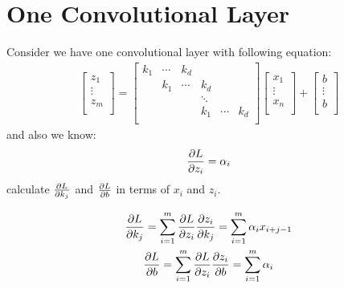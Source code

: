 \documentclass[12pt]{article}
\begin{document}
\section{One Convolutional Layer}
Consider we have one convolutional layer with following equation:
\begin{gather*}
    \begin{bmatrix}
        z_{1}  \\
        \vdots \\
        z_{m}  \\
    \end{bmatrix}
    = \begin{bmatrix}
        k_1 & \cdots & k_d    &        &        &     \\
            & k_1    & \cdots & k_d    &        &     \\
            &        &        & \ddots &        &     \\
            &        &        & k_1    & \cdots & k_d \\
    \end{bmatrix}
    \begin{bmatrix}
        x_{1}  \\
        \vdots \\
        x_{n}  \\
    \end{bmatrix}
    + \begin{bmatrix}
        b      \\
        \vdots \\
        b      \\
    \end{bmatrix}
\end{gather*}
and also we know:
\begin{gather*}
    \pdv{L}{z_i} = \alpha_i
\end{gather*}
calculate $\pdv{L}{k_j}$ and $\pdv{L}{b}$ in terms of $x_i$ and $z_i$.
\begin{qsolve}
    \begin{gather*}
        \pdv{L}{k_j} = \sum_{i=1}^{m} \pdv{L}{z_i} \pdv{z_i}{k_j} = \sum_{i=1}^{m} \alpha_i x_{i+j-1} \\
        \pdv{L}{b} = \sum_{i=1}^{m} \pdv{L}{z_i} \pdv{z_i}{b} = \sum_{i=1}^{m} \alpha_i
    \end{gather*}
\end{qsolve}
\end{document}
